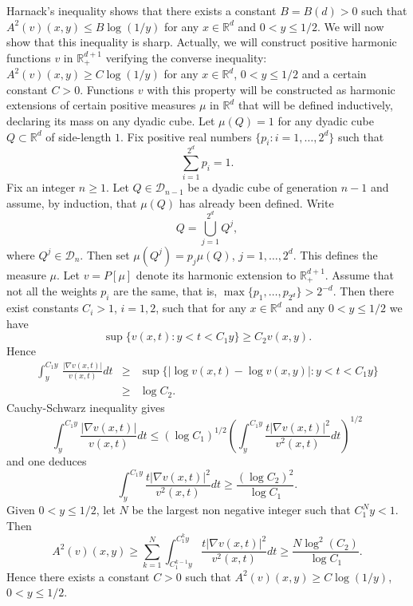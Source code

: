 \documentclass[11pt,letterpaper]{amsart}
\theoremstyle{definition}
\numberwithin{equation}{section}
\newcommand{\R}{\mathbb R}
\begin{document}
Harnack's inequality shows that there exists a constant $B=B(d)>0$ such that $A^2 (v) (x,y) \leq B \log (1/y)$ for any $x \in \R^d $ and $0<y \leq 1/2$. We will now show that this inequality is sharp. Actually, we will construct positive harmonic functions $v$ in $\R_+^{d+1}$ verifying the converse inequality: $A^2 (v) (x,y) \geq C \log (1/y)$ for any $x \in \R^d$, $0<y \leq 1/2$ and a certain constant $C>0$. Functions $v$ with this property will be constructed as harmonic extensions of certain positive measures $\mu$ in $\R^d$ that will be defined inductively, declaring its mass on any dyadic cube. Let $\mu (Q) = 1$ for any dyadic cube $Q \subset \R^d$ of side-length $1$. Fix positive real numbers $\{ p_i : i=1, \ldots , 2^d \}$ such that 
$$
\sum_{i=1}^{2^d} p_i = 1 . 
$$
Fix an integer $n \geq 1$. Let $Q\in \mathcal{D}_{n-1}$ be a dyadic cube of generation $n-1$ and assume, by induction, that $\mu(Q)$ has already been defined. Write 
$$
Q = \bigcup_{j=1}^{2^d} Q^j , 
$$
where $Q^j \in \mathcal{D}_n$. Then set $\mu (Q^j) = p_j \mu (Q)$, $j=1,\ldots, 2^d$. This defines the measure $\mu$. Let $ v= P[\mu]$ denote its harmonic extension to $\R_+^{d+1}$. Assume that not all the weights $p_i$ are the same, that is,  $\max \{p_1 , \ldots , p_{2^d}\} > 2^{-d}$. Then there exist constants $C_i >1$, $i=1,2$, such that for any $x \in \R^d$ and any $0<y\leq 1/2$ we have
$$
\sup \{ v (x,t) : y < t < C_1 y  \} \geq C_2 v (x,y). 
$$
Hence
\begin{eqnarray*}
\int_{ y }^{C_1y} \, \frac{|\nabla v (x,t)|}{v (x,t)} dt & \geq &  \sup \{| \log v (x,t) - \log v (x,y) | :  y < t < C_1  y  \} \\
& \geq &  \log C_2  . 
\end{eqnarray*}
Cauchy-Schwarz inequality gives 
$$
\int_{ y }^{C_1 y} \frac{|\nabla v (x,t)|}{v (x,t)} dt \leq (\log C_1 )^{1/2} \left( \int_{ y }^{C_1 y} \frac{t |\nabla v (x,t)|^2}{v^2  (x,t)} dt \right)^{1/2} 
$$
and one deduces
$$
\int_{y }^{C_1 y} \frac{t |\nabla v (x,t)|^2}{v^2  (x,t)} dt  \geq  \frac{(\log C_2)^2}{\log C_1} . 
$$
Given $0<y \leq 1/2$, let $N$ be the largest non negative integer such that $C_1^N y <1 $. Then 
$$
A^2 (v) (x,y) \geq \sum_{k=1}^N \int_{C_1^{k-1}y}^{C_1^k y}  \frac{t |\nabla v (x,t)|^2}{v^2 (x,t)} dt \geq \frac{N \log^2 (C_2)}{\log C_1}. 
$$
Hence there exists a constant $C>0$ such that $A^2 (v) (x,y) \geq C \log (1/y)$, $0<y \leq 1/2$. 
\end{document}
